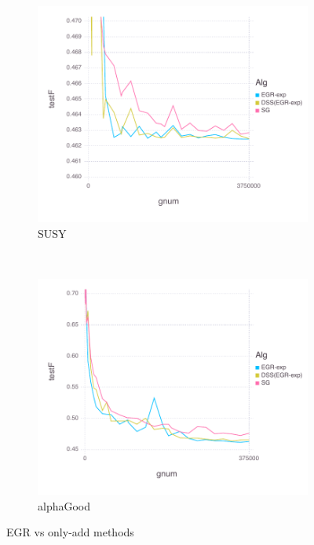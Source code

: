 \documentclass[11pt]{article}
\begin{document}
   \begin{figure}[H]
       \centering
       \begin{subfigure}[b]{0.45\textwidth}
           \includegraphics[width=\textwidth]{Figures/SUSYBLtrueFfFinal-dss.pdf}
           \caption{SUSY}
       \end{subfigure}
       ~ %
         \begin{subfigure}[b]{0.45\textwidth}
           \includegraphics[width=\textwidth]{Figures/alphaGoodBLtrueFfFinal-dss.pdf}
             \caption{alphaGood}
         \end{subfigure}
       \caption{EGR vs only-add methods}\label{fig:SUSYoa}
   \end{figure}
   
\end{document}
